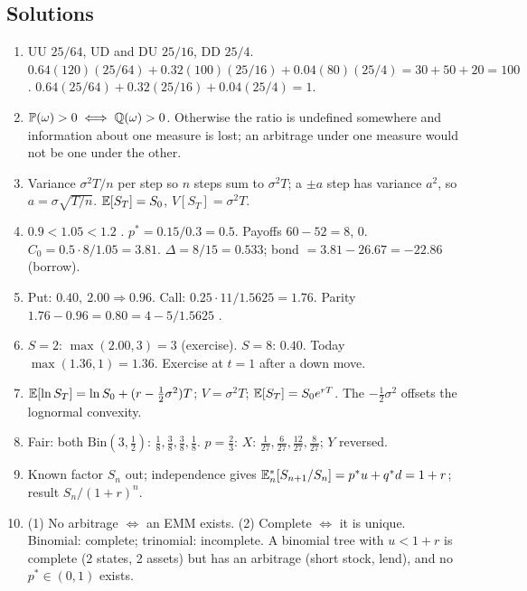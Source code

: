 \documentclass[10pt]{article}
\begin{document}
\subsection*{Solutions}
\begin{enumerate}[label=S\arabic*.]
\item UU $25/64$, UD and DU $25/16$, DD $25/4$. $0.64(120)(25/64)+0.32(100)(25/16)+0.04(80)(25/4)=30+50+20=100$. $0.64(25/64)+0.32(25/16)+0.04(25/4)=1$.
\item $\mathbb{P}(\omega)>0\iff\mathbb{Q}(\omega)>0$. Otherwise the ratio is undefined somewhere and information about one measure is lost; an arbitrage under one measure would not be one under the other.
\item Variance $\sigma^2T/n$ per step so $n$ steps sum to $\sigma^2T$; a $\pm a$ step has variance $a^2$, so $a=\sigma\sqrt{T/n}$. $\mathbb{E}[S_T]=S_0$, $V[S_T]=\sigma^2T$.
\item $0.9<1.05<1.2$ \checkmark. $p^*=0.15/0.3=0.5$. Payoffs $60-52=8$, $0$. $C_0=0.5\cdot8/1.05=3.81$. $\Delta=8/15=0.533$; bond $=3.81-26.67=-22.86$ (borrow).
\item Put: $0.40,\ 2.00\Rightarrow0.96$. Call: $0.25\cdot11/1.5625=1.76$. Parity $1.76-0.96=0.80=4-5/1.5625$ \checkmark.
\item $S=2$: $\max(2.00,3)=3$ (exercise). $S=8$: $0.40$. Today $\max(1.36,1)=1.36$. Exercise at $t=1$ after a down move.
\item $\mathbb{E}[\ln S_T]=\ln S_0+(r-\frac12\sigma^2)T$; $V=\sigma^2T$; $\mathbb{E}[S_T]=S_0e^{rT}$. The $-\frac12\sigma^2$ offsets the lognormal convexity.
\item Fair: both $\mathrm{Bin}(3,\frac12)$: $\frac18,\frac38,\frac38,\frac18$. $p=\frac23$: $X$: $\frac1{27},\frac6{27},\frac{12}{27},\frac8{27}$; $Y$ reversed.
\item Known factor $S_n$ out; independence gives $\mathbb{E}^*_n[S_{n+1}/S_n]=p^*u+q^*d=1+r$; result $S_n/(1+r)^n$.
\item (1) No arbitrage $\iff$ an EMM exists. (2) Complete $\iff$ it is unique. Binomial: complete; trinomial: incomplete. A binomial tree with $u<1+r$ is complete (2 states, 2 assets) but has an arbitrage (short stock, lend), and no $p^*\in(0,1)$ exists.
\end{enumerate}
\end{document}
